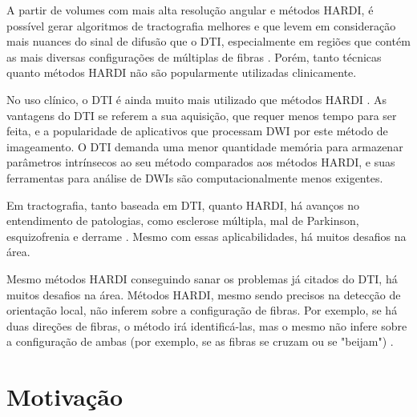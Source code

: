 \documentclass[
    12pt,                %
    oneside,            %
    a4paper,            %
    english,            %
    french,                %
    spanish,            %
    brazil                %
    ]{abntex2}
\begin{document}
A partir de volumes com mais alta resolução angular e métodos HARDI, é possível gerar algoritmos de tractografia melhores e que levem em consideração mais nuances do sinal de difusão que o DTI, especialmente em regiões que contém as mais diversas configurações de múltiplas de fibras \cite{fillard2011}. Porém, tanto técnicas quanto métodos HARDI não são popularmente utilizadas clinicamente. %

No uso clínico, o DTI é ainda muito mais utilizado que métodos HARDI \cite{descoteaux2015}. As vantagens do DTI se referem a sua aquisição, que requer menos tempo para ser feita, e a popularidade de aplicativos que processam DWI por este método de imageamento. O DTI demanda uma menor quantidade memória para armazenar parâmetros intrínsecos ao seu método comparados aos métodos HARDI, e suas ferramentas para análise de DWIs são computacionalmente menos exigentes.

Em tractografia, tanto baseada em DTI, quanto HARDI, há avanços no entendimento de patologias, como esclerose múltipla, mal de Parkinson, esquizofrenia e derrame \cite{SCHILLING2019194}. Mesmo com essas aplicabilidades, há muitos desafios na área.

Mesmo métodos HARDI conseguindo sanar os problemas já citados do DTI, há muitos desafios na área. Métodos HARDI, mesmo sendo precisos na detecção de orientação local, não inferem sobre a configuração de fibras. Por exemplo, se há duas direções de fibras, o método irá identificá-las, mas o mesmo não infere sobre a configuração de ambas (por exemplo, se as fibras se cruzam ou se "beijam")  \cite{SCHILLING2019194}.




\section{Motivação}
\label{ssec:motivation}

\end{document}
